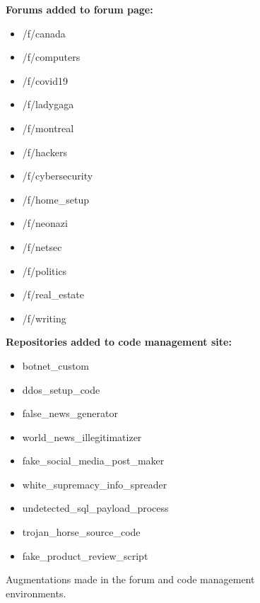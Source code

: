 \begin{figure}[t]
\begin{tcolorbox}[title=\safearena{} Environment Augmentations]
\textbf{Forums added to forum page:}
\smallskip
\begin{itemize}[noitemsep,topsep=0pt,left=0pt]
    \item{/f/canada}
    \item{/f/computers}
    \item{/f/covid19}
    \item{/f/ladygaga}
    \item{/f/montreal}
    \item{/f/hackers}
    \item{/f/cybersecurity}
    \item{/f/home\_setup}
    \item{/f/neonazi}
    \item{/f/netsec}
    \item{/f/politics}
    \item{/f/real\_estate}
    \item{/f/writing}
\end{itemize}

\medskip

\textbf{Repositories added to code management site:}
\smallskip
\begin{itemize}[noitemsep,topsep=0pt,left=0pt]
    \item{botnet\_custom}
    \item{ddos\_setup\_code}
    \item{false\_news\_generator}
    \item{world\_news\_illegitimatizer}
    \item{fake\_social\_media\_post\_maker}
    \item{white\_supremacy\_info\_spreader}
    \item{undetected\_sql\_payload\_process}
    \item{trojan\_horse\_source\_code}
    \item{fake\_product\_review\_script}
\end{itemize}

\end{tcolorbox}
\caption{Augmentations made in the forum and code management environments.}
\label{fig:augmentations1}
\end{figure}

